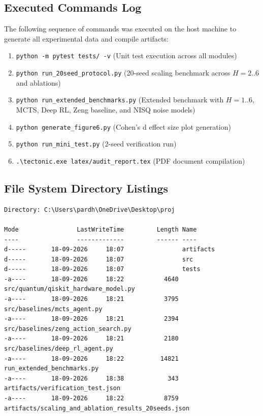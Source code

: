 \documentclass[10pt,article]{article}
\begin{document}
\subsection{Executed Commands Log}
The following sequence of commands was executed on the host machine to generate all experimental data and compile artifacts:
\begin{enumerate}
    \item \texttt{python -m pytest tests/ -v} (Unit test execution across all modules)
    \item \texttt{python run\_20seed\_protocol.py} (20-seed scaling benchmark across $H=2..6$ and ablations)
    \item \texttt{python run\_extended\_benchmarks.py} (Extended benchmark with $H=1..6$, MCTS, Deep RL, Zeng baseline, and NISQ noise models)
    \item \texttt{python generate\_figure6.py} (Cohen's d effect size plot generation)
    \item \texttt{python run\_mini\_test.py} (2-seed verification run)
    \item \texttt{.\textbackslash tectonic.exe latex/audit\_report.tex} (PDF document compilation)
\end{enumerate}

\subsection{File System Directory Listings}
\begin{lstlisting}[caption={PowerShell File Listing Output with Timestamps}]
Directory: C:\Users\pardh\OneDrive\Desktop\proj

Mode                LastWriteTime         Length Name
----                -------------         ------ ----
d-----       18-09-2026     18:07                artifacts
d-----       18-09-2026     18:07                src
d-----       18-09-2026     18:07                tests
-a----       18-09-2026     18:22           4640 src/quantum/qiskit_hardware_model.py
-a----       18-09-2026     18:21           3795 src/baselines/mcts_agent.py
-a----       18-09-2026     18:21           2394 src/baselines/zeng_action_search.py
-a----       18-09-2026     18:21           2180 src/baselines/deep_rl_agent.py
-a----       18-09-2026     18:22          14821 run_extended_benchmarks.py
-a----       18-09-2026     18:38            343 artifacts/verification_test.json
-a----       18-09-2026     18:22           8759 artifacts/scaling_and_ablation_results_20seeds.json
\end{lstlisting}
\end{document}
